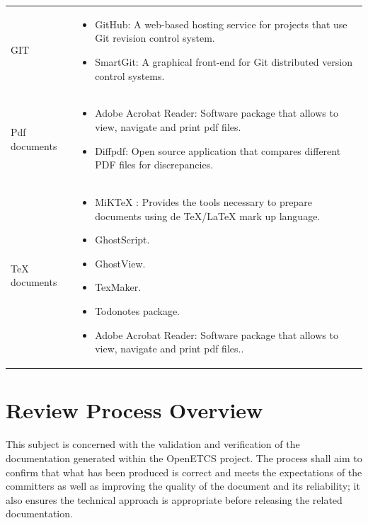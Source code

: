\documentclass{template/openetcs_article}
\begin{document}
\begin{flushleft}

\begin{tabular}{|m{3cm}|m{11cm}|}
\hline
\rowcolor{myblue}
\multicolumn{2}{|c|}{Tools} \\\hline
GIT &
\begin{itemize}
\item GitHub: A web-based hosting service for projects that use Git revision control system.
\item SmartGit: A graphical front-end for Git distributed version control systems. 
\end{itemize}\\\hline
Pdf documents &
\begin{itemize}
\item Adobe Acrobat Reader: Software package that allows to view, navigate and print pdf files.
\item Diffpdf: Open source application that compares different PDF files for discrepancies. 
\end{itemize}\\\hline
TeX documents &
\begin{itemize}
\item MiKTeX : Provides the tools necessary to prepare documents using de TeX/LaTeX mark up language.
\item GhostScript. 
\item GhostView.
\item TexMaker.
\item Todonotes package.
\item Adobe Acrobat Reader: Software package that allows to view, navigate and print pdf files..
\end{itemize}\\\hline
\end{tabular}
\end{flushleft}

\section{Review Process Overview}

This subject is concerned with the validation and verification of the documentation generated within the OpenETCS project.  The process shall aim to confirm that what has been produced is correct and meets the expectations of the committers as well as improving the quality of the document and its reliability; it also ensures the technical approach is appropriate before releasing the related documentation.
\end{document}
